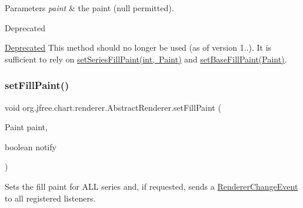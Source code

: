 \begin{DoxyParams}{Parameters}
{\em paint} & the paint ({\ttfamily null} permitted).\\
\hline
\end{DoxyParams}
\begin{DoxyRefDesc}{Deprecated}
\item[\mbox{\hyperlink{deprecated__deprecated000118}{Deprecated}}]This method should no longer be used (as of version 1..). It is sufficient to rely on \mbox{\hyperlink{classorg_1_1jfree_1_1chart_1_1renderer_1_1_abstract_renderer_a58d6e005c9296bacaf29e2cfea8b58b7}{set\+Series\+Fill\+Paint(int, Paint)}} and \mbox{\hyperlink{classorg_1_1jfree_1_1chart_1_1renderer_1_1_abstract_renderer_adc85155c19775ca3f04043f15e060811}{set\+Base\+Fill\+Paint(\+Paint)}}. \end{DoxyRefDesc}
\mbox{\label{classorg_1_1jfree_1_1chart_1_1renderer_1_1_abstract_renderer_aa56f671cc087febb27c2fabf7ffede10}} 
\subsubsection{\texorpdfstring{set\+Fill\+Paint()}{setFillPaint()}\hspace{0.1cm}{\footnotesize\ttfamily [2/2]}}
{\footnotesize\ttfamily void org.\+jfree.\+chart.\+renderer.\+Abstract\+Renderer.\+set\+Fill\+Paint (\begin{DoxyParamCaption}\item[{Paint}]{paint,  }\item[{boolean}]{notify }\end{DoxyParamCaption})}

Sets the fill paint for A\+LL series and, if requested, sends a \mbox{\hyperlink{}{Renderer\+Change\+Event}} to all registered listeners.


